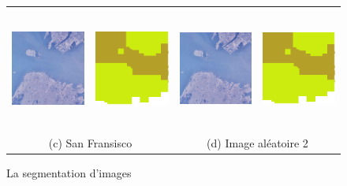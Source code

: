 \begin{figure}
\begin{tabular}{cccc}
\includegraphics[width=4cm, height=4cm]{Figures/chap3/port1.jpg}
&
\includegraphics[width=4cm, height=4cm]{Figures/chap3/san_fransisco2.png}
&
\includegraphics[width=4cm, height=4cm]{Figures/chap3/port1.jpg}
&
\includegraphics[width=4cm, height=4cm]{Figures/chap3/san_fransisco2.png}\\

\multicolumn{2}{c}{(c) San Fransisco}
&
\multicolumn{2}{c}{(d) Image aléatoire 2}

\end{tabular}
\caption[TraitementImage]{La segmentation d'images}

\end{figure}

